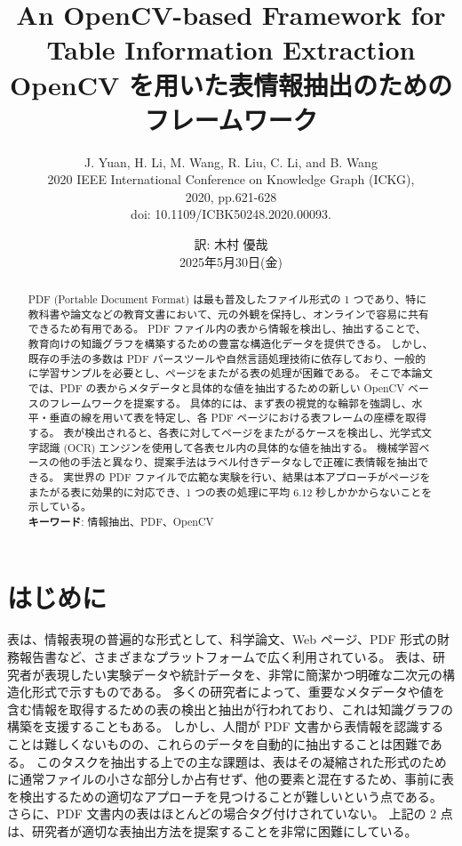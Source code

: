 \documentclass[uplatex, twocolumn,10pt]{jsarticle}
\begin{document}
\title{
    \bf{
        \LARGE{An OpenCV-based Framework for Table Information Extraction} \\
        \Large{OpenCV を用いた表情報抽出のためのフレームワーク}
    }
}
\author{J. Yuan, H. Li, M. Wang, R. Liu, C. Li, and B. Wang \\
    2020 IEEE International Conference on Knowledge Graph (ICKG), \\
    2020, pp.621-628 \\
    doi: 10.1109/ICBK50248.2020.00093.}
\date{訳: 木村 優哉 \\ 2025年5月30日(金)}

\maketitle


\begin{abstract}
    PDF (Portable Document Format) は最も普及したファイル形式の 1 つであり、特に教科書や論文などの教育文書において、元の外観を保持し、オンラインで容易に共有できるため有用である。
    PDF ファイル内の表から情報を検出し、抽出することで、教育向けの知識グラフを構築するための豊富な構造化データを提供できる。
    しかし、既存の手法の多数は PDF パースツールや自然言語処理技術に依存しており、一般的に学習サンプルを必要とし、ページをまたがる表の処理が困難である。
    そこで本論文では、PDF の表からメタデータと具体的な値を抽出するための新しい OpenCV ベースのフレームワークを提案する。
    具体的には、まず表の視覚的な輪郭を強調し、水平・垂直の線を用いて表を特定し、各 PDF ページにおける表フレームの座標を取得する。
    表が検出されると、各表に対してページをまたがるケースを検出し、光学式文字認識 (OCR) エンジンを使用して各表セル内の具体的な値を抽出する。
    機械学習ベースの他の手法と異なり、提案手法はラベル付きデータなしで正確に表情報を抽出できる。
    実世界の PDF ファイルで広範な実験を行い、結果は本アプローチがページをまたがる表に効果的に対応でき、1 つの表の処理に平均 6.12 秒しかかからないことを示している。\\
    \textbf{キーワード}: 情報抽出、PDF、OpenCV
\end{abstract}



\section{はじめに}

表は、情報表現の普遍的な形式として、科学論文、Web ページ、PDF 形式の財務報告書など、さまざまなプラットフォームで広く利用されている。
表は、研究者が表現したい実験データや統計データを、非常に簡潔かつ明確な二次元の構造化形式で示すものである。
多くの研究者によって、重要なメタデータや値を含む情報を取得するための表の検出と抽出が行われており、これは知識グラフの構築を支援することもある。
しかし、人間が PDF 文書から表情報を認識することは難しくないものの、これらのデータを自動的に抽出することは困難である。
このタスクを抽出する上での主な課題は、表はその凝縮された形式のために通常ファイルの小さな部分しか占有せず、他の要素と混在するため、事前に表を検出するための適切なアプローチを見つけることが難しいという点である。
さらに、PDF 文書内の表はほとんどの場合タグ付けされていない。
上記の 2 点は、研究者が適切な表抽出方法を提案することを非常に困難にしている。
\end{document}
